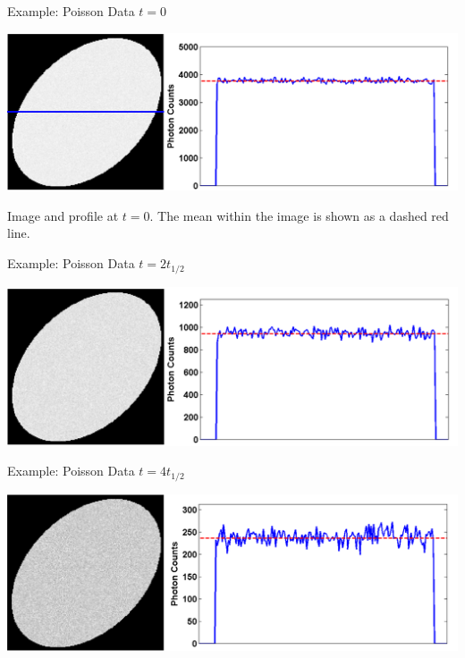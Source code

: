 \begin{frame}{Example: Poisson Data $t = 0$}
    \begin{centering}
        \includegraphics[width=1\textwidth]{images/poisA}\\
    \end{centering}
    Image and profile at $t=0$. The mean within the image is shown as a dashed red line.
\end{frame}

\begin{frame}{Example: Poisson Data $t = 2t_{1/2}$}
    \begin{centering}
        \includegraphics[width=1\textwidth]{images/poisB}\\
    \end{centering}

\end{frame}

\begin{frame}{Example: Poisson Data $t = 4t_{1/2}$}
    \begin{centering}
        \includegraphics[width=1\textwidth]{images/poisC}\\
    \end{centering}

\end{frame}

